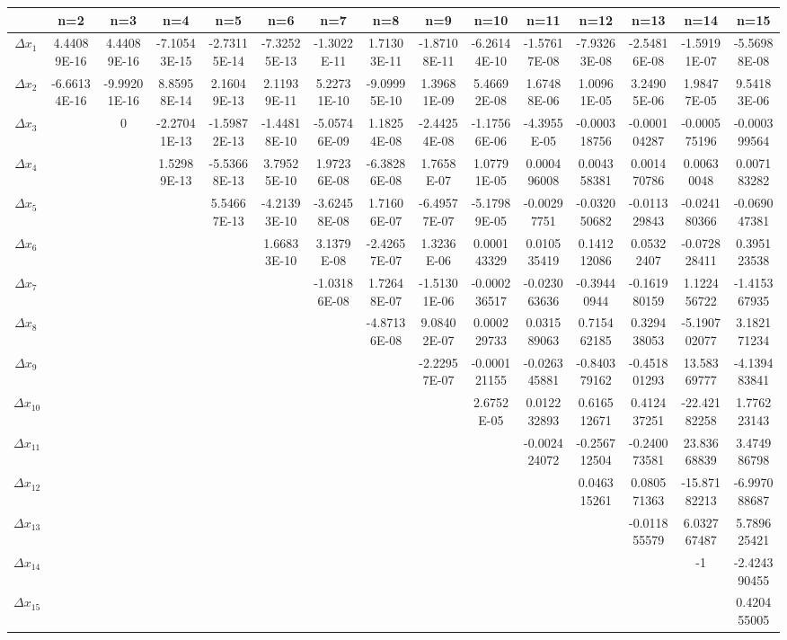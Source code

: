 \documentclass[a4paper]{article}
\begin{document}
\begin{CJK*}{GBK}{song}
\begin{center}
\begin{table*}[!htpb]
{\begin{threeparttable}[!htpb]
\begin{tabular}{ccccc ccccc ccccc}
 &n=2&n=3 &n=4 &n=5 &n=6 &n=7 &n=8 &n=9 &n=10 &n=11 &n=12 &n=13 &n=14 &n=15 \\ \hline
$\Delta x_{1}$	&	4.44089E-16	&	4.44089E-16	&	-7.10543E-15	&	-2.73115E-14	&	-7.32525E-13	&	-1.3022E-11	&	1.71303E-11	&	-1.87108E-11	&	-6.26144E-10	&	-1.57617E-08	&	-7.93263E-08	&	-2.54816E-08	&	-1.59191E-07	&	-5.56988E-08	\\
$\Delta x_{2}$	&	-6.66134E-16	&	-9.99201E-16	&	8.85958E-14	&	2.16049E-13	&	2.11939E-11	&	5.22731E-10	&	-9.09995E-10	&	1.39681E-09	&	5.46692E-08	&	1.67488E-06	&	1.00961E-05	&	3.24905E-06	&	1.98477E-05	&	9.54183E-06	\\
$\Delta x_{3}$	&		&	0	&	-2.27041E-13	&	-1.59872E-13	&	-1.44818E-10	&	-5.05746E-09	&	1.18254E-08	&	-2.44254E-08	&	-1.17566E-06	&	-4.3955E-05	&	-0.000318756	&	-0.000104287	&	-0.000575196	&	-0.000399564	\\
$\Delta x_{4}$	&		&		&	1.52989E-13	&	-5.53668E-13	&	3.79525E-10	&	1.97236E-08	&	-6.38286E-08	&	1.7658E-07	&	1.07791E-05	&	0.000496008	&	0.004358381	&	0.001470786	&	0.00630048	&	0.007183282	\\
$\Delta x_{5}$	&		&		&		&	5.54667E-13	&	-4.21393E-10	&	-3.62458E-08	&	1.71606E-07	&	-6.49577E-07	&	-5.17989E-05	&	-0.00297751	&	-0.032050682	&	-0.011329843	&	-0.024180366	&	-0.069047381	\\
$\Delta x_{6}$	&		&		&		&		&	1.66833E-10	&	3.1379E-08	&	-2.42657E-07	&	1.3236E-06	&	0.000143329	&	0.010535419	&	0.141212086	&	0.05322407	&	-0.072828411	&	0.395123538	\\
$\Delta x_{7}$	&		&		&		&		&		&	-1.03186E-08	&	1.72648E-07	&	-1.51301E-06	&	-0.000236517	&	-0.023063636	&	-0.39440944	&	-0.161980159	&	1.122456722	&	-1.415367935	\\
$\Delta x_{8}$	&		&		&		&		&		&		&	-4.87136E-08	&	9.08402E-07	&	0.000229733	&	0.031589063	&	0.715462185	&	0.329438053	&	-5.190702077	&	3.182171234	\\
$\Delta x_{9}$	&		&		&		&		&		&		&		&	-2.22957E-07	&	-0.000121155	&	-0.026345881	&	-0.840379162	&	-0.451801293	&	13.58369777	&	-4.139483841	\\
$\Delta x_{10}$	&		&		&		&		&		&		&		&		&	2.6752E-05	&	0.012232893	&	0.616512671	&	0.412437251	&	-22.42182258	&	1.776223143	\\
$\Delta x_{11}$	&		&		&		&		&		&		&		&		&		&	-0.002424072	&	-0.256712504	&	-0.240073581	&	23.83668839	&	3.474986798	\\
$\Delta x_{12}$	&		&		&		&		&		&		&		&		&		&		&	0.046315261	&	0.080571363	&	-15.87182213	&	-6.997088687	\\
$\Delta x_{13}$	&		&		&		&		&		&		&		&		&		&		&		&	-0.011855579	&	6.032767487	&	5.789625421	\\
$\Delta x_{14}$	&		&		&		&		&		&		&		&		&		&		&		&		&	-1	&	-2.424390455	\\
$\Delta x_{15}$	&		&		&		&		&		&		&		&		&		&		&		&		&		&	0.420455005	\\


\end{tabular}
\end{threeparttable}}
\end{table*}
\end{center}
\end{CJK*}
\end{document}
